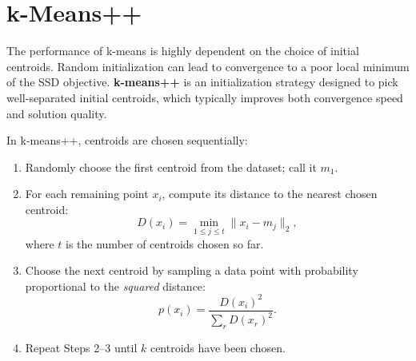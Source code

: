 \documentclass{article}
\begin{document}


\section{k-Means++}

The performance of k-means is highly dependent on the choice of initial
centroids. Random initialization can lead to convergence to a poor local minimum
of the SSD objective. \textbf{k-means++} is an initialization strategy designed to
pick well-separated initial centroids, which typically improves both convergence
speed and solution quality.

In k-means++, centroids are chosen sequentially:

\begin{enumerate}
    \item Randomly choose the first centroid from the dataset; call it $m_1$.

    \item For each remaining point $x_i$, compute its distance to the nearest
    chosen centroid:
    \[
    D(x_i) = \min_{1 \leq j \leq t} \|x_i - m_j\|_2,
    \]
    where $t$ is the number of centroids chosen so far.

    \item Choose the next centroid by sampling a data point with probability
    proportional to the \emph{squared} distance:
    \[
    p(x_i) = \frac{D(x_i)^2}{\sum_{r} D(x_r)^2}.
    \]

    \item Repeat Steps 2--3 until $k$ centroids have been chosen.

\end{enumerate}
\end{document}
